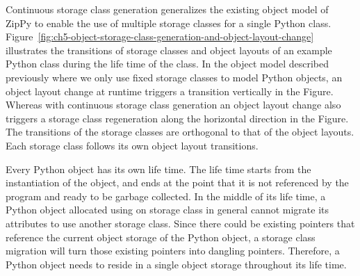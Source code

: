 Continuous storage class generation generalizes the existing object model of ZipPy to enable the use of multiple storage classes for a single Python class.
Figure~\ref{fig:ch5-object-storage-class-generation-and-object-layout-change} illustrates the transitions of storage classes and object layouts of an example Python class during the life time of the class.
In the object model described previously where we only use fixed storage classes to model Python objects, an object layout change at runtime triggers a transition vertically in the Figure.
Whereas with continuous storage class generation an object layout change also triggers a storage class regeneration along the horizontal direction in the Figure.
The transitions of the storage classes are orthogonal to that of the object layouts.
Each storage class follows its own object layout transitions.

Every Python object has its own life time.
The life time starts from the instantiation of the object, and ends at the point that it is not referenced by the program and ready to be garbage collected.
In the middle of its life time, a Python object allocated using on storage class in general cannot migrate its attributes to use another storage class.
Since there could be existing pointers that reference the current object storage of the Python object, a storage class migration will turn those existing pointers into dangling pointers.
Therefore, a Python object needs to reside in a single object storage throughout its life time.

